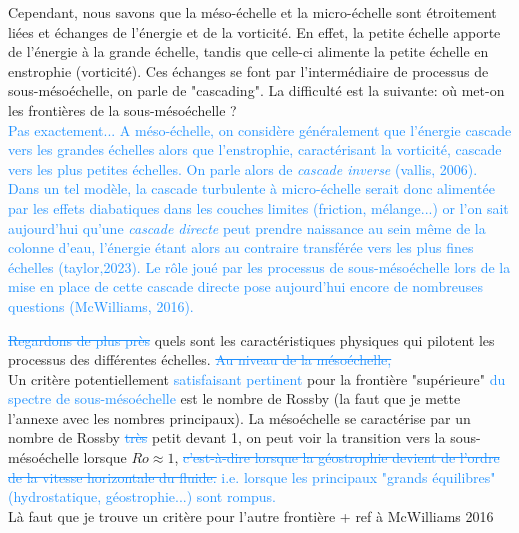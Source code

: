\documentclass{rapportECC}
\newcommand{\FAadd}[1]{\textcolor{DodgerBlue}{{#1}}}                     %
\newcommand{\FAdel}[1]{\textcolor{DodgerBlue}{\sout{#1}}}                %
\begin{document}
Cependant, nous savons que la méso-échelle et la micro-échelle sont étroitement liées et échanges de l'énergie et de la vorticité. En effet, la petite échelle apporte de l'énergie à la grande échelle, tandis que celle-ci alimente la petite échelle en enstrophie (vorticité). Ces échanges se font par l'intermédiaire de processus de sous-mésoéchelle, on parle de "cascading". La difficulté est la suivante: où met-on les frontières de la sous-mésoéchelle ? \\ 

\FAadd{Pas exactement... A méso-échelle, on considère généralement que l'énergie cascade vers les grandes échelles alors que l'enstrophie, caractérisant la vorticité, cascade vers les plus petites échelles. On parle alors de \textit{cascade inverse} (vallis, 2006). Dans un tel modèle, la cascade turbulente à micro-échelle serait donc alimentée par les effets diabatiques dans les couches limites (friction, mélange...) or l'on sait aujourd'hui qu'une \textit{cascade directe} peut prendre naissance au sein même de la colonne d'eau, l'énergie étant alors au contraire transférée vers les plus fines échelles (taylor,2023). Le rôle joué par les processus de sous-mésoéchelle lors de la mise en place de cette cascade directe pose aujourd'hui encore de nombreuses questions (McWilliams, 2016).}

\FAdel{Regardons de plus près} quels sont les caractéristiques physiques qui pilotent les processus des différentes échelles. \FAdel{Au niveau de la mésoéchelle,}\\

Un critère potentiellement \FAadd{satisfaisant} \FAadd{pertinent} pour la frontière "supérieure" \FAadd{du spectre de sous-mésoéchelle} est le nombre de Rossby (la faut que je mette l'annexe avec les nombres principaux). La mésoéchelle se caractérise par un nombre de Rossby \FAdel{très} petit devant 1, on peut voir la transition vers la sous-mésoéchelle lorsque $Ro \approx 1$, \FAdel{c'est-à-dire lorsque la géostrophie devient de l'ordre de la vitesse horizontale du fluide.} \FAadd{i.e. lorsque les principaux "grands équilibres" (hydrostatique, géostrophie...) sont rompus.} \\
Là faut que je trouve un critère pour l'autre frontière + ref à McWilliams 2016
\end{document}
